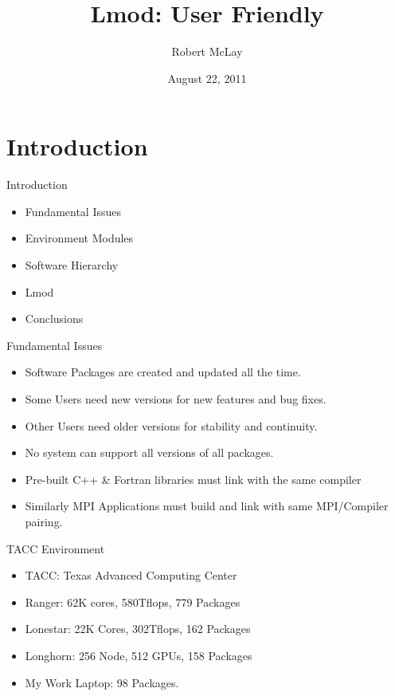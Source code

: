 \documentclass{beamer}
\title{Lmod: User Friendly}
\author{Robert McLay}
\institute{The Texas Advanced Computing Center}
\date{August 22, 2011}  %
\begin{document}
\begin{frame}
  \titlepage
\end{frame}

\section{Introduction}

\begin{frame}{Introduction}
  \begin{itemize}
    \item Fundamental Issues
    \item Environment Modules
    \item Software Hierarchy
    \item Lmod
    \item Conclusions
  \end{itemize}
\end{frame}


\begin{frame}{Fundamental Issues}
  \begin{itemize}
    \item Software Packages are created and updated all the time.
    \item Some Users need new versions for new features and bug fixes.
    \item Other Users need older versions for stability and continuity.
    \item No system can support all versions of all packages.
    \item Pre-built C++ \& Fortran libraries must link with the same compiler
    \item Similarly MPI Applications must build and link with same
      MPI/Compiler pairing.
  \end{itemize}
\end{frame}

\begin{frame}{TACC Environment}
  \begin{itemize}
    \item TACC: Texas Advanced Computing Center
    \item Ranger: 62K cores, 580Tflops, 779 Packages
    \item Lonestar: 22K Cores, 302Tflops, 162 Packages
    \item Longhorn: 256 Node, 512 GPUs, 158 Packages
    \item My Work Laptop: 98 Packages.
  \end{itemize}
\end{frame}
\end{document}
